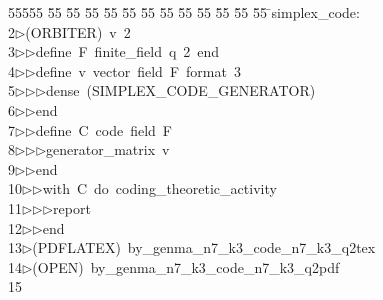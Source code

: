 %
%
\begin{tabbing}
55555 \= 55 \= 55 \= 55 \= 55 \= 55 \= 55 \= 55 \= 55 \= 55 \= 55 \= 55 \= 55 \= \>simplex\_code:\\[0pt]
2\>$\triangleright$\>(ORBITER)\ v\ 2\ \\[0pt]
3\>$\triangleright$\>$\triangleright$\>define\ F\ finite\_field\ q\ 2\ end\ \\[0pt]
4\>$\triangleright$\>$\triangleright$\>define\ v\ vector\ field\ F\ format\ 3\ \\[0pt]
5\>$\triangleright$\>$\triangleright$\>$\triangleright$\>dense\ (SIMPLEX\_CODE\_GENERATOR)\ \\[0pt]
6\>$\triangleright$\>$\triangleright$\>end\ \\[0pt]
7\>$\triangleright$\>$\triangleright$\>define\ C\ code\ field\ F\ \\[0pt]
8\>$\triangleright$\>$\triangleright$\>$\triangleright$\>generator\_matrix\ v\ \\[0pt]
9\>$\triangleright$\>$\triangleright$\>end\ \\[0pt]
10\>$\triangleright$\>$\triangleright$\>with\ C\ do\ coding\_theoretic\_activity\ \\[0pt]
11\>$\triangleright$\>$\triangleright$\>$\triangleright$\>report\ \\[0pt]
12\>$\triangleright$\>$\triangleright$\>end\\[0pt]
13\>$\triangleright$\>(PDFLATEX)\ by\_genma\_n7\_k3\_code\_n7\_k3\_q2tex\\[0pt]
14\>$\triangleright$\>(OPEN)\ by\_genma\_n7\_k3\_code\_n7\_k3\_q2pdf\\[0pt]
15\>\end{tabbing}
